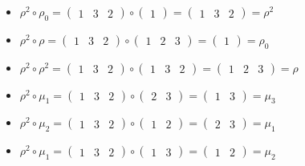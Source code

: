 \documentclass{article}
\begin{document}
\begin{itemize}
        \item $\rho^2\circ\rho_0 =\begin{pmatrix}1&3&2\end{pmatrix}\circ\begin{pmatrix}1\end{pmatrix}=\begin{pmatrix}1&3&2\end{pmatrix}=\rho^2$
        \item $\rho^2\circ\rho =\begin{pmatrix}1&3&2\end{pmatrix}\circ\begin{pmatrix}1&2&3\end{pmatrix}=\begin{pmatrix}1\end{pmatrix}=\rho_0$
        \item $\rho^2\circ\rho^2 =\begin{pmatrix}1&3&2\end{pmatrix}\circ\begin{pmatrix}1&3&2\end{pmatrix}=\begin{pmatrix}1&2&3\end{pmatrix}=\rho$
        \item $\rho^2\circ\mu_1 =\begin{pmatrix}1&3&2\end{pmatrix}\circ\begin{pmatrix}2&3\end{pmatrix}=\begin{pmatrix}1&3\end{pmatrix}=\mu_3$
        \item $\rho^2\circ\mu_2 =\begin{pmatrix}1&3&2\end{pmatrix}\circ\begin{pmatrix}1&2\end{pmatrix}=\begin{pmatrix}2&3\end{pmatrix}=\mu_1$
        \item $\rho^2\circ\mu_1 =\begin{pmatrix}1&3&2\end{pmatrix}\circ\begin{pmatrix}1&3\end{pmatrix}=\begin{pmatrix}1&2\end{pmatrix}=\mu_2$
        

\end{itemize}
\end{document}
